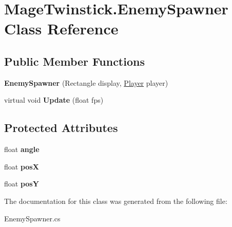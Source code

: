 \hypertarget{class_mage_twinstick_1_1_enemy_spawner}{}\section{Mage\+Twinstick.\+Enemy\+Spawner Class Reference}
\label{class_mage_twinstick_1_1_enemy_spawner}
\subsection*{Public Member Functions}
\begin{DoxyCompactItemize}
\item 
\hypertarget{class_mage_twinstick_1_1_enemy_spawner_abd353f77aec752709c47a110a15a1bb2}{}{\bfseries Enemy\+Spawner} (Rectangle display, \hyperlink{class_mage_twinstick_1_1_player}{Player} player)\label{class_mage_twinstick_1_1_enemy_spawner_abd353f77aec752709c47a110a15a1bb2}

\item 
\hypertarget{class_mage_twinstick_1_1_enemy_spawner_a4e22661d16cc2c9671eefe32fda8a42e}{}virtual void {\bfseries Update} (float fps)\label{class_mage_twinstick_1_1_enemy_spawner_a4e22661d16cc2c9671eefe32fda8a42e}

\end{DoxyCompactItemize}
\subsection*{Protected Attributes}
\begin{DoxyCompactItemize}
\item 
\hypertarget{class_mage_twinstick_1_1_enemy_spawner_ae8e524a6c9480737390fcf8903c924b7}{}float {\bfseries angle}\label{class_mage_twinstick_1_1_enemy_spawner_ae8e524a6c9480737390fcf8903c924b7}

\item 
\hypertarget{class_mage_twinstick_1_1_enemy_spawner_afae9c62c10aab60fb5232880bdc58eef}{}float {\bfseries pos\+X}\label{class_mage_twinstick_1_1_enemy_spawner_afae9c62c10aab60fb5232880bdc58eef}

\item 
\hypertarget{class_mage_twinstick_1_1_enemy_spawner_a202528664dcf4d1107551469b7147a36}{}float {\bfseries pos\+Y}\label{class_mage_twinstick_1_1_enemy_spawner_a202528664dcf4d1107551469b7147a36}

\end{DoxyCompactItemize}


The documentation for this class was generated from the following file\+:\begin{DoxyCompactItemize}
\item 
Enemy\+Spawner.\+cs\end{DoxyCompactItemize}
